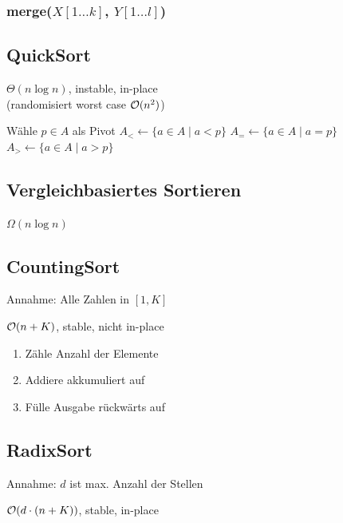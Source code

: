 \begin{algorithm}[H]
\end{algorithm}

\subsubsection*{merge($X[1\ldots k]$, $Y[1\ldots l]$)}
\begin{algorithm}[H]
\end{algorithm}

\subsection*{QuickSort}
$\Theta(n \log n)$, instable, in-place\\
(randomisiert worst case $\mathcal{O}(n^2)$)

\begin{algorithm}[H]
	Wähle $p\in A$ als Pivot\;
	$A_{<} \gets \{a\in A \mid a < p\}$\;
	$A_{=} \gets \{a\in A \mid a = p\}$\;
	$A_{>} \gets \{a\in A \mid a > p\}$\;
	\KwRet [QSort($A_{<}$), $A_{=}$, QSort($A_{>}$)]\;
\end{algorithm}

\subsection*{Vergleichbasiertes Sortieren}
$\Omega(n \log n)$

\subsection*{CountingSort}
Annahme: Alle Zahlen in $[1,K]$

$\mathcal{O}(n+K)$, stable, nicht in-place
\begin{enumerate}
	\item Zähle Anzahl der Elemente
	\item Addiere akkumuliert auf
	\item Fülle Ausgabe rückwärts auf
\end{enumerate}

\subsection*{RadixSort}
Annahme: $d$ ist max. Anzahl der Stellen

$\mathcal{O}(d \cdot (n + K))$, stable, in-place

\begin{algorithm}[H]
\end{algorithm}
